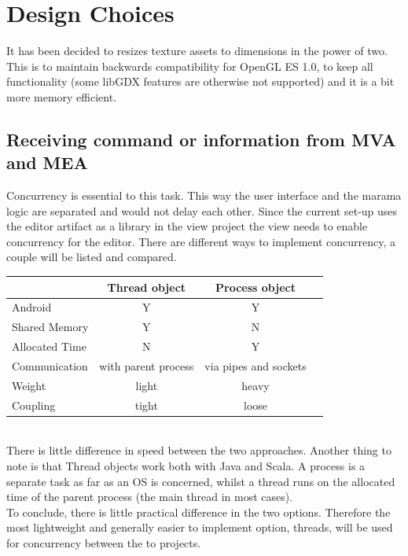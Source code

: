 \documentclass[10pt]{extarticle} %
\begin{document}
    \newpage

    \section{Design Choices}
    \label{sec:designchoices}
    It has been decided to resizes texture assets to dimensions in the power of two.
    This is to maintain backwards compatibility for OpenGL ES 1.0, to keep all functionality (some libGDX features are otherwise not supported) and it is a bit more memory efficient.\cite{libgdxpottex}

    \subsection[Communication MVA-MEA]{Receiving command or information from MVA and MEA}
    \label{subsec:comchoice}
    Concurrency is essential to this task.
    This way the user interface and the marama logic are separated and would not delay each other.
    Since the current set-up uses the editor artifact as a library in the view project the view needs to enable concurrency for the editor.
    There are different ways to implement concurrency, a couple will be listed and compared.\\
    \begin{tabular}[c]{| l || c | c | c}
        \hline
        & Thread object & Process object\\\cline{2-3}\hline
        Android & Y & Y \\
        Shared Memory\cite{vogeljavaconc,noobbookjavaconc} & Y & N \\
        Allocated Time\cite{vogeljavaconc} & N & Y \\
        Communication\cite{noobbookjavaconc} & with parent process & via pipes and sockets \\
        Weight\cite{noobbookjavaconc,stackjavaconc,develjavaconc} & light & heavy \\
        Coupling\cite{stackjavaconc} & tight & loose \\
        \hline
    \end{tabular}\\
    There is little difference in speed\cite{stackjavaconc} between the two approaches.
    Another thing to note is that Thread objects work both with Java and Scala.
    A process is a separate task as far as an OS is concerned, whilst a thread runs on the allocated time of the parent process (the main thread in most cases).\\
    To conclude, there is little practical difference in the two options.
    Therefore the most lightweight and generally easier to implement option, threads, will be used for concurrency between the to projects.
\end{document}

